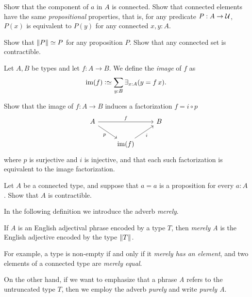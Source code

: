 \begin{xca}\label{xca:component-connected}
Show that the component of $a$ in $A$ is connected.
Show that connected elements have the same 
\emph{propositional} properties, that is, 
for any predicate $P:A\to{\mathcal{U}}$, $P(x)$ is equivalent
to $P(y)$ for any connected $x,y:A$. 
\end{xca}

\begin{xca}\label{xca:prop-set-trivia}
Show that $\lVert P\rVert \simeq P$ for any proposition $P$.
Show that any connected set is contractible.
\end{xca}

\begin{definition}\label{def:prop-image}
  Let $A,B$ be types and let $f : A \to B$. We define the \emph{image} of $f$ as
  \[
    \im(f) \defeq \sum_{y:B}\exists_{x:A}(y = f\,x).
  \]
\end{definition}

\begin{xca}\label{xca:unique-fact-image}
  Show that the image of $f : A \to B$ induces a factorization $f = i\circ p$
  \[
    \begin{tikzcd}
      A \ar[rr,"f"]\ar[dr,"p"'] & & B \\
      & \im(f)\ar[ur,"i"'] &
    \end{tikzcd}
  \]
  where $p$ is surjective and $i$ is injective, and that each such factorization
  is equivalent to the image factorization.
\end{xca}

\begin{xca}\label{xca:connected-trivia}
Let $A$ be a connected type, and suppose that $a=a$ is a proposition for every $a:A$. 
Show that $A$ is contractible.
\end{xca}

In the following definition we introduce the adverb {\em merely}.

\begin{definition}\label{def:merely}
  If {\em A} is an English adjectival phrase encoded by a type $T$, 
  then {\em merely A} is the English adjective encoded by the type $\lVert T\rVert$.
\end{definition}

For example, a type is non-empty if and only if it {\em merely has an element}, and two elements of a connected type are {\em merely equal}.

On the other hand, if we want to emphasize that a phrase \emph{A} refers to the
untruncated type $T$, then we employ the adverb \emph{purely}
and write \emph{purely A}.


